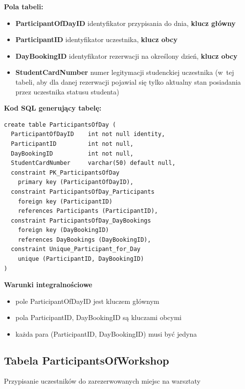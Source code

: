 \documentclass[12pt, a4paper]{mwrep}
\begin{document}
\noindent \textbf{Pola tabeli:}
\begin{itemize}
  \item \textbf{ParticipantOfDayID} \ppauza identyfikator przypisania do dnia, \textbf{klucz główny}
  \item \textbf{ParticipantID} \ppauza identyfikator uczestnika, \textbf{klucz obcy}
  \item \textbf{DayBookingID} \ppauza identyfikator rezerwacji na określony dzień, \textbf{klucz obcy}
  \item \textbf{StudentCardNumber} \ppauza numer legitymacji studenckiej uczestnika (w~tej tabeli, aby dla danej rezerwacji pojawial się tylko aktualny stan posiadania przez uczestnika statusu studenta)
\end{itemize}

\vspace{0.5cm}
\noindent \textbf{Kod SQL generujący tabelę:}

\begin{lstlisting}
create table ParticipantsOfDay (
  ParticipantOfDayID    int not null identity,
  ParticipantID         int not null,
  DayBookingID          int not null,
  StudentCardNumber     varchar(50) default null,
  constraint PK_ParticipantsOfDay 
    primary key (ParticipantOfDayID),
  constraint ParticipantsOfDay_Participants 
    foreign key (ParticipantID) 
    references Participants (ParticipantID),
  constraint ParticipantsOfDay_DayBookings 
    foreign key (DayBookingID) 
    references DayBookings (DayBookingID),
  constraint Unique_Participant_for_Day 
    unique (ParticipantID, DayBookingID)
)
\end{lstlisting}

\vspace{0.5cm}
\noindent \textbf{Warunki integralnościowe}
\begin{itemize}
  \item pole ParticipantOfDayID jest kluczem głównym
  \item pola ParticipantID, DayBookingID są kluczami obcymi
  \item każda para (ParticipantID, DayBookingID) musi być jedyna
\end{itemize}

\subsection{Tabela ParticipantsOfWorkshop}

\noindent Przypisanie uczestników do zarezerwowanych miejsc na warsztaty
\end{document}
